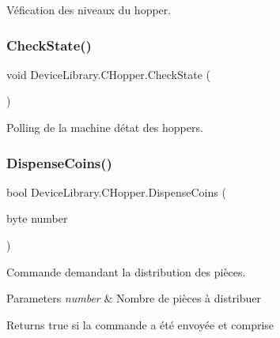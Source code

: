 Véfication des niveaux du hopper. 

\mbox{\label{class_device_library_1_1_c_hopper_a43760bb1d6cac2e875eb6ddb7615a90a}} 
\subsubsection{\texorpdfstring{Check\+State()}{CheckState()}}
{\footnotesize\ttfamily void Device\+Library.\+C\+Hopper.\+Check\+State (\begin{DoxyParamCaption}{ }\end{DoxyParamCaption})\hspace{0.3cm}{\ttfamily [inline]}}



Polling de la machine d\textquotesingle{}état des hoppers. 

\mbox{\label{class_device_library_1_1_c_hopper_adc0fd478490e3ef5e255f7bc2f64f506}} 
\subsubsection{\texorpdfstring{Dispense\+Coins()}{DispenseCoins()}}
{\footnotesize\ttfamily bool Device\+Library.\+C\+Hopper.\+Dispense\+Coins (\begin{DoxyParamCaption}\item[{byte}]{number }\end{DoxyParamCaption})\hspace{0.3cm}{\ttfamily [inline]}}



Commande demandant la distribution des pièces. 


\begin{DoxyParams}{Parameters}
{\em number} & Nombre de pièces à distribuer\\
\hline
\end{DoxyParams}
\begin{DoxyReturn}{Returns}
true si la commande a été envoyée et comprise
\end{DoxyReturn}


